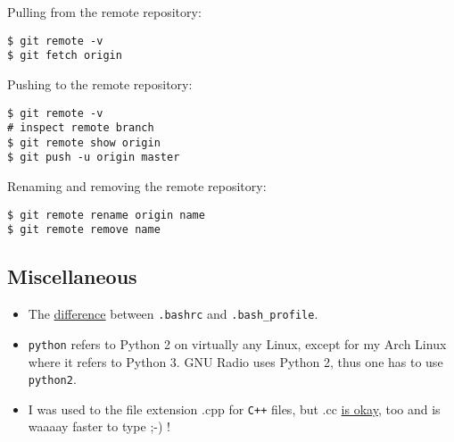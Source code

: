 \documentclass{article}
\begin{document}
Pulling from the remote repository:

\begin{verbatim}
$ git remote -v
$ git fetch origin
\end{verbatim}

Pushing to the remote repository:

\begin{verbatim}
$ git remote -v
# inspect remote branch
$ git remote show origin
$ git push -u origin master
\end{verbatim}

Renaming and removing the remote repository:

\begin{verbatim}
$ git remote rename origin name
$ git remote remove name 
\end{verbatim}

\subsection{Miscellaneous}

\begin{itemize}
	\item The \href{http://www.joshstaiger.org/archives/2005/07/bash_profile_vs.html }{difference} between \verb|.bashrc| and \verb|.bash_profile|.
	
	\item \verb|python| refers to Python 2 on virtually any Linux, except for my Arch Linux where it refers to Python 3. GNU Radio uses Python 2, thus one has to use \verb|python2|. 
	
	\item I was used to the file extension .cpp for \texttt{C++} files, but .cc \href{http://stackoverflow.com/questions/1545080/c-code-file-extension-cc-vs-cpp}{is okay}, too and is waaaay faster to type ;-) !
\end{itemize}
\end{document}
